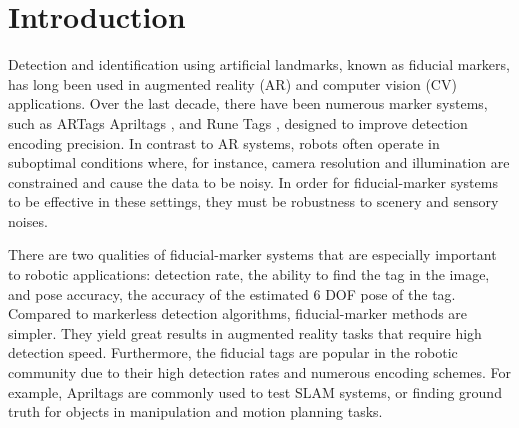 \section{Introduction}
\label{sec:intro}

Detection and identification using artificial landmarks, known as fiducial markers, has long been used in augmented reality (AR) and computer vision (CV) applications. Over the last decade, there have been numerous marker systems, such as ARTags \citep{fiala2004artag} Apriltags \citep{olson2011apriltag}, and Rune Tags \citep{bergamasco2011rune}, designed to improve detection encoding precision. In contrast to AR systems, robots often operate in suboptimal conditions where, for instance, camera resolution and illumination are constrained and cause the data to be noisy. In order for fiducial-marker systems to be effective in these settings, they must be robustness to scenery and sensory noises.

	There are two qualities of fiducial-marker systems that are especially important to robotic applications: detection rate, the ability to find the tag in the image, and pose accuracy, the accuracy of the estimated 6 DOF pose of the tag. Compared to markerless detection algorithms, fiducial-marker methods are simpler. They yield great results in augmented reality tasks that require high detection speed. Furthermore, the fiducial tags are popular in the robotic community due to their high detection rates and numerous encoding schemes. For example, Apriltags are commonly used to test SLAM systems, or finding ground truth for objects in manipulation and motion planning tasks.  

